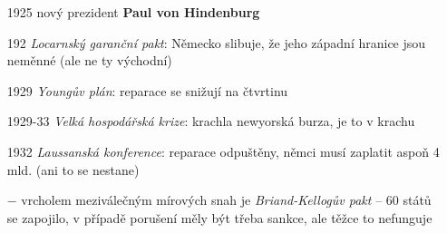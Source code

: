 \documentclass{article}
\begin{document}
\begin{itemize}
  \item[1925] nový prezident \textbf{Paul von Hindenburg}
  \item[192] \textit{Locarnský garanční pakt}: Německo slibuje, že jeho západní hranice jsou neměnné (ale ne ty východní)
  \item[1929] \textit{Youngův plán}: reparace se snižují na čtvrtinu
  \item[1929-33] \textit{Velká hospodářská krize}: krachla newyorská burza, je to v krachu
  \item[1932] \textit{Laussanská konference}: reparace odpuštěny, němci musí zaplatit aspoň 4 mld. (ani to se nestane)
  \item[$-$] vrcholem meziválečným mírových snah je \textit{Briand-Kellogův pakt}  -- 60 států se zapojilo, v případě porušení měly být třeba sankce, ale těžce to nefunguje
\end{itemize}
\end{document}
